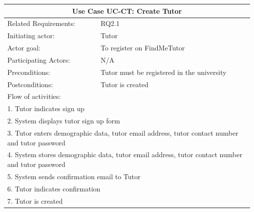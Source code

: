 \documentclass[12pt]{article}
\begin{document}
{\begin{tabular}{| l | l| }
			\hline\multicolumn{2}{|c|}{ \textbf{Use Case UC-CT: Create Tutor}} \\ \hline
			Related Requirements: & RQ2.1 \\ \hline
			Initiating actor: & Tutor \\ \hline
			Actor goal: & To register on FindMeTutor\\ \hline
			Participating Actors: & N/A\\ \hline
			Preconditions: &Tutor must be registered in the university\\ \hline
			Postconditions: & Tutor is created\\ \hline
			\multicolumn{2}{|l|}{Flow of activities:}\\ \hline
			\multicolumn{2}{|p{15cm}|}{1. Tutor indicates sign up}\\
			\multicolumn{2}{|p{15cm}|}{2. System displays tutor sign up form}\\
			\multicolumn{2}{|p{15cm}|}{3. Tutor enters demographic data, tutor email address, tutor contact number and tutor password}	\\
			\multicolumn{2}{|p{15cm}|}{4. System stores demographic data, tutor email address, tutor contact number and tutor password}\\
			\multicolumn{2}{|l|}{5. System sends confirmation email to Tutor}\\
			\multicolumn{2}{|l|}{6. Tutor indicates confirmation}	\\
			\multicolumn{2}{|l|}{7. Tutor is created}
			\\ \hline
		\end{tabular}



}
\end{document}
